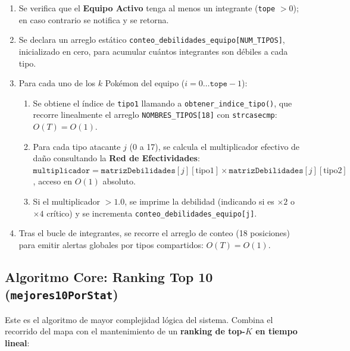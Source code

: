 \documentclass[12pt, letterpaper]{article}
\begin{document}
\begin{enumerate}
    \item Se verifica que el \textbf{Equipo Activo} tenga al menos un integrante (\texttt{tope} $> 0$); en caso contrario se notifica y se retorna.
    \item Se declara un arreglo estático \texttt{conteo\_debilidades\_equipo[NUM\_TIPOS]}, inicializado en cero, para acumular cuántos integrantes son débiles a cada tipo.
    \item Para cada uno de los $k$ Pokémon del equipo ($i = 0 \ldots \texttt{tope}-1$):
    \begin{enumerate}
        \item Se obtiene el índice de \texttt{tipo1} llamando a \texttt{obtener\_indice\_tipo()}, que recorre linealmente el arreglo \texttt{NOMBRES\_TIPOS[18]} con \texttt{strcasecmp}: $O(T)=O(1)$.
        \item Para cada tipo atacante $j$ (0 a 17), se calcula el multiplicador efectivo de daño consultando la \textbf{Red de Efectividades}: $\texttt{multiplicador} = \texttt{matrizDebilidades}[j][\text{tipo1}] \times \texttt{matrizDebilidades}[j][\text{tipo2}]$, acceso en $O(1)$ absoluto.
        \item Si el multiplicador $> 1.0$, se imprime la debilidad (indicando si es $\times 2$ o $\times 4$ crítico) y se incrementa \texttt{conteo\_debilidades\_equipo[j]}.
    \end{enumerate}
    \item Tras el bucle de integrantes, se recorre el arreglo de conteo (18 posiciones) para emitir alertas globales por tipos compartidos: $O(T) = O(1)$.
\end{enumerate}

\subsection{Algoritmo Core: Ranking Top 10 (\texttt{mejores10PorStat})}

Este es el algoritmo de mayor complejidad lógica del sistema. Combina el recorrido del mapa con el mantenimiento de un \textbf{ranking de top-$K$ en tiempo lineal}:
\end{document}
